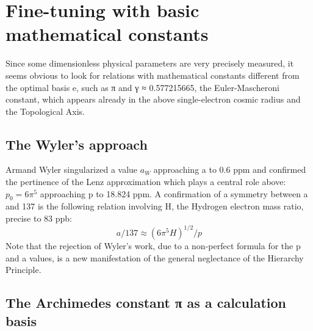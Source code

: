 \chapter{Fine-tuning with basic mathematical constants}
\label{chap:chapter_3}

Since some dimensionless physical parameters are very precisely measured, it seems obvious to look for
relations with mathematical constants different from the optimal basis e, such as π and γ ≈
0.577215665, the Euler-Mascheroni constant, which appears already in the above single-electron
cosmic radius and the Topological Axis.

\section {The Wyler's approach}

Armand Wyler singularized a value $a_{W}$ approaching a to 0.6 ppm and confirmed the pertinence
of the Lenz approximation which plays a central role above: $p_{0} = 6\pi^{5}$ approaching p to 18.824 ppm.
A confirmation of a symmetry between a and 137 is the following relation involving H, the
Hydrogen electron mass ratio, precise to 83 ppb:
$$a/137 ≈ (6\pi^{5} H)^{1/2} /p$$
Note that the rejection of Wyler's work, due to a non-perfect formula for the p and a values, is a new
manifestation of the general neglectance of the Hierarchy Principle.

\section {The Archimedes constant π as a calculation basis}

